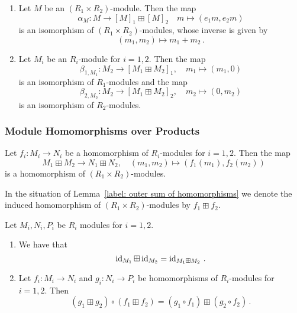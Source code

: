 \begin{theorem}
  \label{theorem: equivalence of modules for objects}
  \leavevmode
  \begin{enumerate}
    \item
      Let $M$ be an $(R_1 \times R_2)$-module.
      Then the map
      \[
                \alpha_M
        \colon  M
        \to     [M]_1 \boxplus [M]_2
        \quad   m
        \mapsto (e_1 m, e_2 m)
      \]
      is an isomorphism of $(R_1 \times R_2)$-modules, whose inverse is given by
      \[
                (m_1, m_2)
        \mapsto m_1 + m_2 \,.
      \]
    \item
      Let $M_i$ be an $R_i$-module for $i = 1, 2$.
      Then the map
      \[
                \beta_{1, M_1}
        \colon  M_2
        \to     [M_1 \boxplus M_2]_1,
        \quad   m_1
        \mapsto (m_1, 0)
      \]
      is an isomorphism of $R_1$-modules and the map
      \[
                \beta_{2, M_2}
        \colon  M_2
        \to     [M_1 \boxplus M_2]_2,
        \quad   m_2
        \mapsto (0, m_2)
      \]
      is an isomorphism of $R_2$-modules.
  \end{enumerate}
\end{theorem}




\subsubsection{Module Homomorphisms over Products}


\begin{lemma}
  \label{label: outer sum of homomorphisms}
  Let $f_i \colon M_i \to N_i$ be a homomorphism of $R_i$-modules for $i = 1, 2$.
  Then the map
  \[
            M_1 \boxplus M_2
    \to     N_1 \boxplus N_2,
    \quad   (m_1, m_2)
    \mapsto (f_1(m_1), f_2(m_2))
  \]
  is a homomorphism of $(R_1 \times R_2)$-modules.
\end{lemma}


\begin{definition}
  In the situation of Lemma~\ref{label: outer sum of homomorphisms} we denote the induced homomorphism of $(R_1 \times R_2)$-modules by $f_1 \boxplus f_2$.
\end{definition}


\begin{lemma}
  Let $M_i, N_i, P_i$ be $R_i$ modules for $i = 1, 2$.
  \begin{enumerate}
    \item
      We have that
      \[
          \operatorname{id}_{M_1} \boxplus \operatorname{id}_{M_2}
        = \operatorname{id}_{M_1 \boxplus M_2} \,.
      \]
    \item
      Let $f_i \colon M_i \to N_i$ and $g_i \colon N_i \to P_i$ be homomorphisms of $R_i$-modules for $i = 1, 2$.
      Then
      \[
          (g_1 \boxplus g_2) \circ (f_1 \boxplus f_2)
        = (g_1 \circ f_1) \boxplus (g_2 \circ f_2) \,.
      \]
  \end{enumerate}
\end{lemma}


